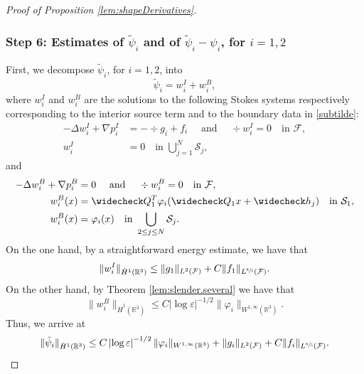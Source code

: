 \documentclass[JEP,XML,SOM,Unicode, NoEqCountersInSection,NoFloatCountersInSection,published]{cedram}
\newcommand{\R}{\mathbb{R}}
\let\eps\varepsilon
\theoremstyle{definition}
\theoremstyle{remark}
\begin{document}
\begin{proof}[Proof of Proposition \ref{lem:shapeDerivatives}]
\subsubsection*{Step 6: Estimates of $\tilde \psi_i$ and of $\tilde \psi_i - \psi_i$, for $i=1,2$}
First, we decompose $\tilde \psi_i$, for $i=1,2$, into
\[
\tilde \psi_i = w_i^I + w_i^B,\] where $ w_i^I $ and $ w_i^B$ are the solutions to the following Stokes systems respectively corresponding to the interior source term and to the boundary data in \eqref{subtilde}:
\begin{align*}
- \Delta w_i^I + \nabla p_i^I &= -\div g_i + f_i \quad \text{ and } \quad \div w_i^I = 0 \quad \text{in } \mathcal F, \\
w_i^I &= 0 \quad \text{in } \bigcup_{j=1}^N \mathcal S_j,
\end{align*}
and
\begin{align*}
- \Delta w_i^{B} + \nabla p_i^{B} &= 0 \quad \text{ and } \quad \div w_i^{B} = 0 \quad \text{in } \mathcal F, \\
w_i^{B}(x) &= \widecheck Q_1^T \varphi_i(\widecheck Q_1 x + \widecheck h_j)\quad \text{in } \mathcal S_1, \\
w_i^{B}(x) &= \varphi_i(x) \quad \text{in } \bigcup_{2 \leq j \leq N} \mathcal S_j.
\end{align*}
On the one hand, by a straightforward energy estimate, we have that
\begin{equation*}
\| w^I_i \|_{\dot H^1(\R^3)} \leq \|g_1\|_{L^2 (\mathcal F)} + C \|f_1\|_{L^{\sfrac 6 5 }(\mathcal F)}.
\end{equation*}
On the other hand, by Theorem \ref{lem:slender.several}
we have that
\begin{equation*}
\| w_i^{B} \|_{\dot H^1 (\R^3)} \leq C \left|\log \eps\right|^{-1/2}\| \varphi_i\|_{W^{1,\infty}(\R^3)}.
\end{equation*}
Thus, we arrive at
\begin{equation}
\label{midi2}
\|\tilde \psi_i\|_{\dot H^1(\R^3)} \leq C \left|\log \eps\right|^{-1/2}\| \varphi_i\|_{W^{1,\infty} (\R^3)} + \| g_i\|_{L^2(\mathcal F)} + C \|f_i\|_{L^{\sfrac 6 5 }(\mathcal F)}.
\end{equation}


\end{proof}
\end{document}
